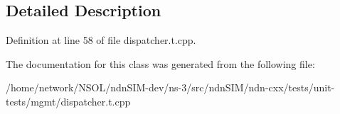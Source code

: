 \subsection{Detailed Description}


Definition at line 58 of file dispatcher.\+t.\+cpp.



The documentation for this class was generated from the following file\+:\begin{DoxyCompactItemize}
\item 
/home/network/\+N\+S\+O\+L/ndn\+S\+I\+M-\/dev/ns-\/3/src/ndn\+S\+I\+M/ndn-\/cxx/tests/unit-\/tests/mgmt/dispatcher.\+t.\+cpp\end{DoxyCompactItemize}
